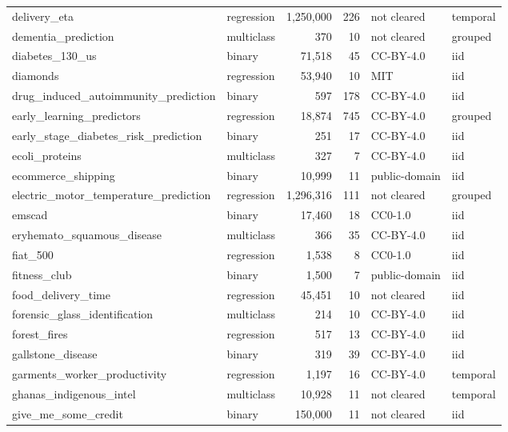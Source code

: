 \begin{longtable}{>{\raggedright\arraybackslash}p{5.5cm}lrrll}
delivery\_\allowbreak{}eta & regression & 1,250,000 & 226 & not cleared & temporal\\
dementia\_\allowbreak{}prediction & multiclass & 370 & 10 & not cleared & grouped\\
diabetes\_\allowbreak{}130\_\allowbreak{}us & binary & 71,518 & 45 & CC-BY-4.0 & iid\\
diamonds & regression & 53,940 & 10 & MIT & iid\\
drug\_\allowbreak{}induced\_\allowbreak{}autoimmunity\_\allowbreak{}prediction & binary & 597 & 178 & CC-BY-4.0 & iid\\
early\_\allowbreak{}learning\_\allowbreak{}predictors & regression & 18,874 & 745 & CC-BY-4.0 & grouped\\
early\_\allowbreak{}stage\_\allowbreak{}diabetes\_\allowbreak{}risk\_\allowbreak{}prediction & binary & 251 & 17 & CC-BY-4.0 & iid\\
ecoli\_\allowbreak{}proteins & multiclass & 327 & 7 & CC-BY-4.0 & iid\\
ecommerce\_\allowbreak{}shipping & binary & 10,999 & 11 & public-domain & iid\\
electric\_\allowbreak{}motor\_\allowbreak{}temperature\_\allowbreak{}prediction & regression & 1,296,316 & 111 & not cleared & grouped\\
emscad & binary & 17,460 & 18 & CC0-1.0 & iid\\
eryhemato\_\allowbreak{}squamous\_\allowbreak{}disease & multiclass & 366 & 35 & CC-BY-4.0 & iid\\
fiat\_\allowbreak{}500 & regression & 1,538 & 8 & CC0-1.0 & iid\\
fitness\_\allowbreak{}club & binary & 1,500 & 7 & public-domain & iid\\
food\_\allowbreak{}delivery\_\allowbreak{}time & regression & 45,451 & 10 & not cleared & iid\\
forensic\_\allowbreak{}glass\_\allowbreak{}identification & multiclass & 214 & 10 & CC-BY-4.0 & iid\\
forest\_\allowbreak{}fires & regression & 517 & 13 & CC-BY-4.0 & iid\\
gallstone\_\allowbreak{}disease & binary & 319 & 39 & CC-BY-4.0 & iid\\
garments\_\allowbreak{}worker\_\allowbreak{}productivity & regression & 1,197 & 16 & CC-BY-4.0 & temporal\\
ghanas\_\allowbreak{}indigenous\_\allowbreak{}intel & multiclass & 10,928 & 11 & not cleared & temporal\\
give\_\allowbreak{}me\_\allowbreak{}some\_\allowbreak{}credit & binary & 150,000 & 11 & not cleared & iid\\

\end{longtable}
